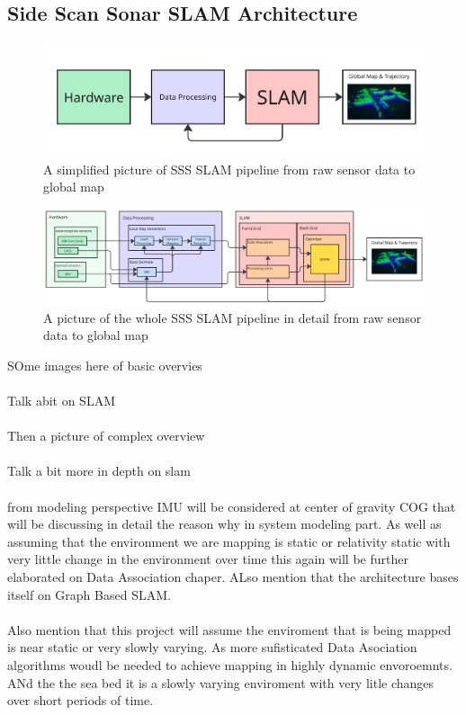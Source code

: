 \subsection{Side Scan Sonar SLAM Architecture}
\begin{figure}[H]
    \centering
    \includegraphics[width=1.0\linewidth]{Pictures/Introduction/SSS_SLAM_Architecture/Simplified.png}
    \caption{A simplified picture of SSS SLAM pipeline from raw sensor data to global map}
    \label{fig:SSS-SLAM-Architecture-Simplified}
\end{figure}
\begin{figure}[H]
    \centering
    \includegraphics[width=1.0\linewidth]{Pictures/Introduction/SSS_SLAM_Architecture/Full.png}
    \caption{A picture of the whole SSS SLAM pipeline in detail from raw sensor data to global map}
    \label{fig:SSS-SLAM-Architecture-Full}
\end{figure}
\noindent
SOme images here of basic overvies
\\ \\
Talk abit on SLAM
\\ \\
Then a picture of complex overview
\\ \\
Talk a bit more in depth on slam
\\ \\
from modeling perspective IMU will be considered at center of gravity COG that will be discussing in detail the reason why in system modeling part. As well as assuming that the environment we are mapping is static or relativity static with very little change in the environment over time this again will be further elaborated on Data Association chaper. ALso mention that the architecture bases itself on Graph Based SLAM.
\\ \\
Also mention that this project will assume the enviroment that is being mapped is near static or very slowly varying. As more sufisticated Data Asociation algorithms woudl be needed to achieve mapping in highly dynamic envoroemnts. ANd the the sea bed it is a slowly varying enviroment with very litle changes over short periods of time. 